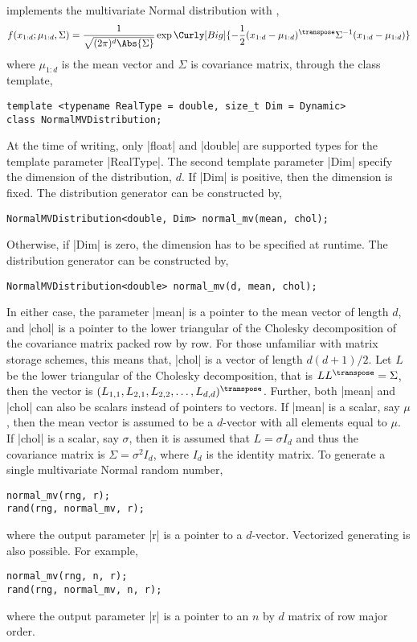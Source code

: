 \mckl implements the multivariate Normal distribution with \pdf,
\begin{equation*}
  f(x_{1:d};\mu_{1:d},\Sigma) = \frac{1}{\sqrt{(2\pi)^d\Abs{\Sigma}}}
  \exp\Curly[Big]{-\frac{1}{2}
    (x_{1:d} - \mu_{1:d})^{\transpose}\Sigma^{-1}(x_{1:d} - \mu_{1:d})}
\end{equation*}
where $\mu_{1:d}$ is the mean vector and $\Sigma$ is covariance matrix, through
the class template,
\begin{Verbatim}
template <typename RealType = double, size_t Dim = Dynamic>
class NormalMVDistribution;
\end{Verbatim}
At the time of writing, only |float| and |double| are supported types for the
template parameter |RealType|. The second template parameter |Dim| specify the
dimension of the distribution, $d$. If |Dim| is positive, then the dimension is
fixed. The distribution generator can be constructed by,
\begin{Verbatim}
NormalMVDistribution<double, Dim> normal_mv(mean, chol);
\end{Verbatim}
Otherwise, if |Dim| is zero, the dimension has to be specified at runtime. The
distribution generator can be constructed by,
\begin{Verbatim}
NormalMVDistribution<double> normal_mv(d, mean, chol);
\end{Verbatim}
In either case, the parameter |mean| is a pointer to the mean vector of length
$d$, and |chol| is a pointer to the lower triangular of the Cholesky
decomposition of the covariance matrix packed row by row. For those unfamiliar
with matrix storage schemes, this means that, |chol| is a vector of length
$d(d+1)/2$. Let $L$ be the lower triangular of the Cholesky decomposition, that
is $LL^{\transpose} = \Sigma$, then the vector is
$(L_{1,1},L_{2,1},L_{2,2},\dots,L_{d,d})^{\transpose}$. Further, both |mean|
and |chol| can also be scalars instead of pointers to vectors. If |mean| is a
scalar, say $\mu$, then the mean vector is assumed to be a $d$-vector with all
elements equal to $\mu$. If |chol| is a scalar, say $\sigma$, then it is
assumed that $L = \sigma I_d$ and thus the covariance matrix is $\Sigma =
\sigma^2 I_d$, where $I_d$ is the identity matrix. To generate a single
multivariate Normal random number,
\begin{Verbatim}
normal_mv(rng, r);
rand(rng, normal_mv, r);
\end{Verbatim}
where the output parameter |r| is a pointer to a $d$-vector. Vectorized
generating is also possible. For example,
\begin{Verbatim}
normal_mv(rng, n, r);
rand(rng, normal_mv, n, r);
\end{Verbatim}
where the output parameter |r| is a pointer to an $n$ by $d$ matrix of row
major order.

